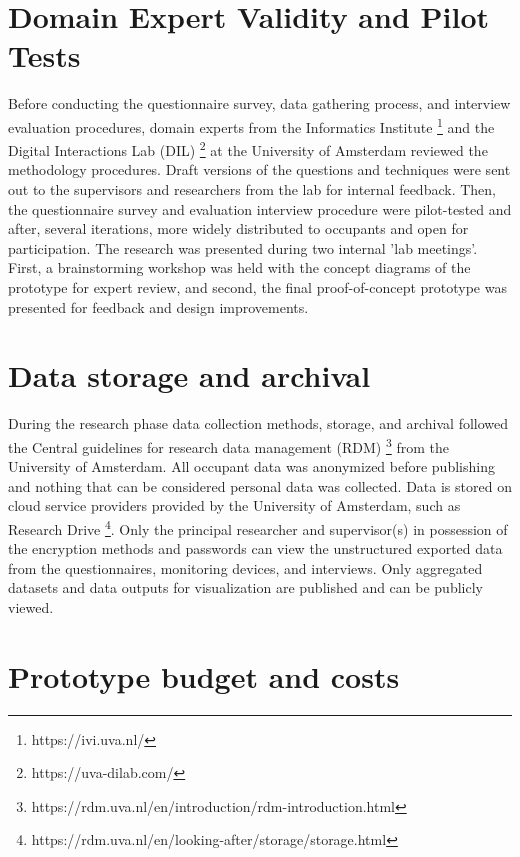 \begin{appendices}
\section{Domain Expert Validity and Pilot Tests}
\label{appendix:experts}

Before conducting the questionnaire survey, data gathering process, and interview evaluation procedures, domain experts from the Informatics Institute \footnote{https://ivi.uva.nl/} and the Digital Interactions Lab (DIL) \footnote{https://uva-dilab.com/} at the University of Amsterdam reviewed the methodology procedures. Draft versions of the questions and techniques were sent out to the supervisors and researchers from the lab for internal feedback. Then, the questionnaire survey and evaluation interview procedure were pilot-tested and after, several iterations, more widely distributed to occupants and open for participation. The research was presented during two internal 'lab meetings'. First, a brainstorming workshop was held with the concept diagrams of the prototype for expert review, and second, the final proof-of-concept prototype was presented for feedback and design improvements. 


\section{Data storage and archival}
\label{appendix:data}

During the research phase data collection methods, storage, and archival followed the Central guidelines for research data management (RDM) \footnote{https://rdm.uva.nl/en/introduction/rdm-introduction.html} from the University of Amsterdam. All occupant data was anonymized before publishing and nothing that can be considered personal data was collected. Data is stored on cloud service providers provided by the University of Amsterdam, such as Research Drive \footnote{https://rdm.uva.nl/en/looking-after/storage/storage.html}. Only the principal researcher and supervisor(s) in possession of the encryption methods and passwords can view the unstructured exported data from the questionnaires, monitoring devices, and interviews. Only aggregated datasets and data outputs for visualization are published and can be publicly viewed.

\section{Prototype budget and costs}
\label{appendix:ethical}


\end{appendices}
